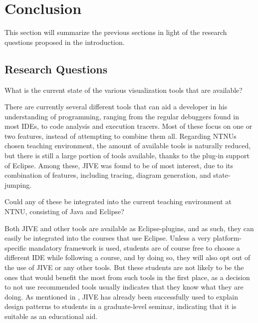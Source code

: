 \chapter{Conclusion}\label{conclusion}
This section will summarize the previous sections in light of the research questions proposed in the introduction.

\section{Research Questions}\label{conclusionRQs}


\begin{theorem}
What is the current state of the various visualization tools that are available?
\end{theorem}

There are currently several different tools that can aid a developer in his understanding of programming, ranging from the regular debuggers found in most IDEs, to code analysis and execution tracers.
Most of these focus on one or two features, instead of attempting to combine them all.
Regarding NTNUs chosen teaching environment, the amount of available tools is naturally reduced, but there is still a large portion of tools available, thanks to the plug-in support of Eclipse.
Among these, JIVE was found to be of most interest, due to its combination of features, including tracing, diagram generation, and state-jumping.
~\\

\begin{theorem}
Could any of these be integrated into the current teaching environment at NTNU, consisting of Java and Eclipse?
\end{theorem}

Both JIVE and other tools are available as Eclipse-plugins, and as such, they can easily be integrated into the courses that use Eclipse.
Unless a very platform-specific mandatory framework is used, students are of course free to choose a different IDE while following  a course, and by doing so, they will also opt out of the use of JIVE or any other tools.
But these students are not likely to be the ones that would benefit the most from such tools in the first place, as a decision to not use recommended tools usually indicates that they know what they are doing. %
As mentioned in \cite[p. 99]{Gestwicki2005}, JIVE has already been successfully used to explain design patterns to students in a graduate-level seminar, indicating that it is suitable as an educational aid.
~\\


